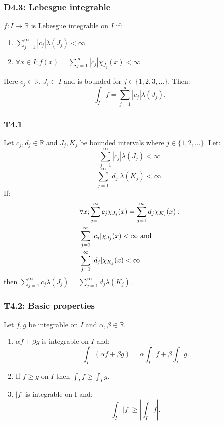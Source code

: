 \documentclass{article}
\begin{document}
\begin{multicols*}{3}
\subsubsection*{D4.3: Lebesgue integrable}
$f:I\rightarrow\mathbb{R}$ is Lebesgue integrable on $I$ if:
\begin{enumerate}
    \item $\displaystyle\sum_{j=1}^{\infty} |c_j| \lambda(J_j) < \infty$

    \item $\forall x\in I; f(x)=\displaystyle\sum_{j=1}^{\infty} |c_j| \chi_{J_j}(x)<\infty$
\end{enumerate}
Here $c_j \in \mathbb{R}$, $J_i \subset I$ and is bounded for 
$j \in \{1, 2, 3, \dots\}$. Then:
$$\int_I f = \sum_{j=1}^{\infty} |c_j| \lambda(J_j).$$

\subsubsection*{T4.1}
Let $c_j,d_j\in\mathbb{R}$ and $J_j,K_j$ be bounded intervals
where $j\in\{1,2,\dots\}$. Let:
$$\sum_{j=1}^{\infty}|c_j|\lambda(J_j)<\infty$$
$$\sum_{j=1}^{\infty}|d_j|\lambda(K_j)<\infty.$$
If:
\begin{align*}
    &\forall x;\sum_{j=1}^{\infty}c_j\chi_{J_j}(x)
    =\sum_{j=1}^{\infty}d_j\chi_{K_j}(x): \\
    &\sum_{j=1}^{\infty}|c_j|\chi_{J_j}(x)<\infty
    \hspace*{0.05in}\text{and} \\
    &\sum_{j=1}^{\infty}|d_j|\chi_{K_j}(x)<\infty
\end{align*}
then $\displaystyle\sum_{j=1}^{\infty}c_j\lambda(J_j)
=\sum_{j=1}^{\infty}d_j\lambda(K_j)$.

\subsubsection*{T4.2: Basic properties}
Let $f,g$ be integrable on $I$ and $\alpha,\beta\in\mathbb{R}$.
\begin{enumerate}
    \item $\alpha f+\beta g$ is integrable on $I$ and:
    $$\int_I(\alpha f+\beta g)
    =\alpha\int_I f+\beta\int_I g.$$

    \item If $f\geq g$ on $I$
    then $\displaystyle\int_I f\geq\int_I g$.

    \item $|f|$ is integrable on I and:
    $$\int_I |f|\geq\left|\int_I f\right|.$$


\end{enumerate}
\end{multicols*}
\end{document}
